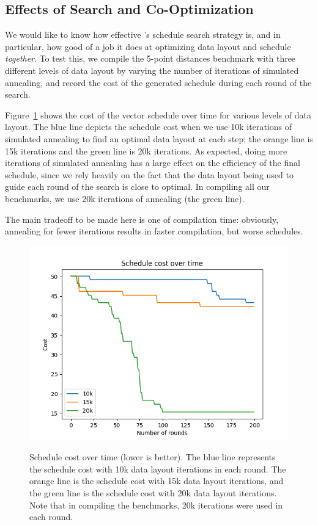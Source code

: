 \subsection{Effects of Search and Co-Optimization}\label{sec:search-and-cooptimization}
We would like to know how effective \system's schedule search strategy is, and in particular, how good of a job it does at optimizing data layout and schedule {\em together}.
To test this, we compile the 5-point distances benchmark with three different levels of data layout by varying the number of iterations of simulated annealing, and record the cost of the generated schedule during each round of the search.

Figure~\ref{fig:schedule-cost} shows the cost of the vector schedule over time for various levels of data layout.
The blue line depicts the schedule cost when we use 10k iterations of simulated annealing to find an optimal data layout at each step; the orange line is 15k iterations and the green line is 20k iterations.
As expected, doing more iterations of simulated annealing has a large effect on the efficiency of the final schedule, since we rely heavily on the fact that the data layout being used to guide each round of the search is close to optimal.
In compiling all our benchmarks, we use 20k iterations of annealing (the green line).

The main tradeoff to be made here is one of compilation time: obviously, annealing for fewer iterations results in faster compilation, but worse schedules.
\begin{figure}
    \includegraphics[width=0.7\linewidth]{figures/graphs/schedules.png}
    \caption{Schedule cost over time (lower is better). The blue line represents the schedule cost with 10k data layout iterations in each round. The orange line is the schedule cost with 15k data layout iterations, and the green line is the schedule cost with 20k data layout iterations. Note that in compiling the benchmarks, 20k iterations were used in each round.}
    \label{fig:schedule-cost}
\end{figure}


